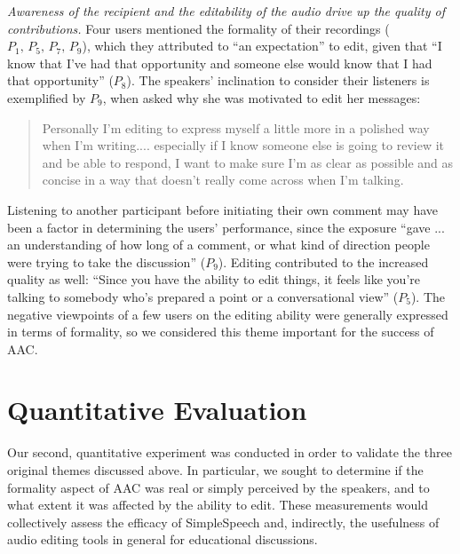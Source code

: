 \emph{Awareness of the recipient and the editability of the audio drive up the quality of contributions.}
Four users mentioned the formality of their recordings ($P_1,\,P_5,\,P_7,\,P_9$), which they attributed to ``an expectation'' to edit, given that ``I know that I've had that opportunity and someone else would know that I had that opportunity'' ($P_8$).
The speakers' inclination to consider their listeners is exemplified by $P_9$, when asked why she was motivated to edit her messages:
\begin{quote}
	Personally I'm editing to express myself a little more in a polished way when I'm writing.... especially if I know someone else is going to review it and be able to respond, I want to make sure I'm as clear as possible and as concise in a way that doesn't really come across when I'm talking.
\end{quote}
Listening to another participant before initiating their own comment may have been a factor in determining the users' performance, since the exposure ``gave ... an understanding of how long of a comment, or what kind of direction people were trying to take the discussion'' ($P_9$). 
Editing contributed to the increased quality as well: ``Since you have the ability to edit things, it feels like you're talking to somebody who's prepared a point or a conversational view'' ($P_5$). 
The negative viewpoints of a few users on the editing ability were generally expressed in terms of formality, so we considered this theme important for the success of AAC. 

\section{Quantitative Evaluation}
Our second, quantitative experiment was conducted in order to validate the three original themes discussed above.
In particular, we sought to determine if the formality aspect of AAC was real or simply perceived by the speakers, and to what extent it was affected by the ability to edit.
These measurements would collectively assess the efficacy of SimpleSpeech and, indirectly, the usefulness of audio editing tools in general for educational discussions.

